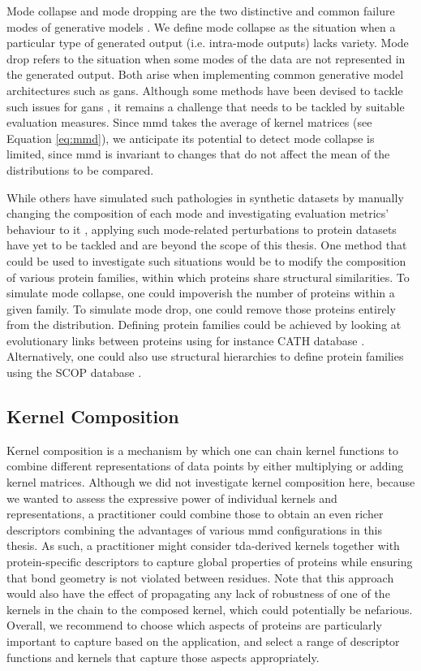 Mode collapse and mode dropping are the two distinctive and common failure modes
of generative models \citep{salimans2016improved}. We define mode collapse as
the situation when a particular type of generated output (i.e. intra-mode
outputs) lacks variety. Mode drop refers to the situation when some modes of the
data are not represented in the generated output. Both arise when implementing
common generative model architectures such as \acrshort{gans}. Although some
methods have been devised to tackle such issues for \acrshort{gans}
\citep{arjovsky2017wasserstein, goodfellow2014generative}, it remains a
challenge that needs to be tackled by suitable evaluation measures. Since
\gls{mmd} takes the average of kernel matrices (see Equation \ref{eq:mmd}),
we anticipate its potential to detect mode collapse is limited, since
\gls{mmd} is invariant to changes that do not affect the mean of the
distributions to be compared.

While others have simulated such pathologies in synthetic datasets by manually
changing the composition of each mode and investigating evaluation metrics'
behaviour to it \citep{thompson2022evaluation}, applying such mode-related
perturbations to protein datasets have yet to be tackled and are beyond the
scope of this thesis. One method that could be used to investigate such
situations would be to modify the composition of various protein families,
within which proteins share structural similarities. To simulate mode collapse,
one could impoverish the number of proteins within a given family. To simulate
mode drop, one could remove those proteins entirely from the distribution.
Defining protein families could be achieved by looking at evolutionary links
between proteins using for instance CATH database \citep{orengo1997cath}.
Alternatively, one could also use structural hierarchies to define protein
families using the SCOP database \citep{murzin1995scop}.

\subsection{Kernel Composition}

Kernel composition is a mechanism by which one can chain kernel functions to
combine different representations of data points by either multiplying or adding
kernel matrices. Although we did not investigate kernel composition here,
because we wanted to assess the expressive power of individual kernels and
representations, a practitioner could combine those to obtain an even richer
descriptors combining the advantages of various \gls{mmd} configurations in this
thesis. As such, a practitioner might consider \gls{tda}-derived kernels together with
protein-specific descriptors to capture global properties of proteins while
ensuring that bond geometry is not violated between residues. Note that this
approach would also have the effect of propagating any lack of robustness of one
of the kernels in the chain to the composed kernel, which could potentially be
nefarious. Overall, we recommend to choose which aspects of proteins are
particularly important to capture based on the application, and select a range
of descriptor functions and kernels that capture those aspects appropriately.

